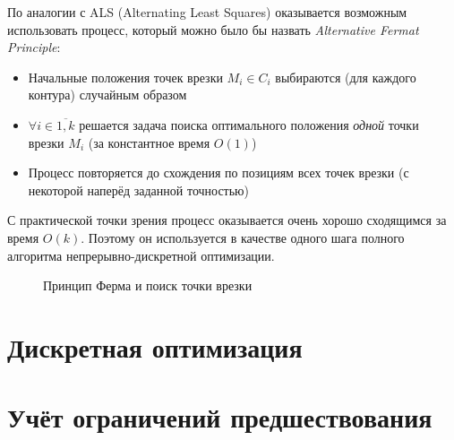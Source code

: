 \documentclass{article}
\begin{document}
По аналогии с ALS
(Alternating Least Squares)
оказывается возможным использовать
процесс,
который можно было бы назвать
\textit{Alternative Fermat Principle}:
\begin{itemize}
    \item{}
    Начальные положения точек врезки 
    $M_i \in C_i$
    выбираются
    (для каждого контура)
    случайным образом
    \item{}
    $\forall i \in \overline{1,k}$
    решается задача поиска оптимального положения
    \textit{одной} точки врезки $M_i$
    (за константное время $O(1)$)
    \item{}
    Процесс повторяется до схождения
    по позициям всех точек врезки
    (с некоторой наперёд заданной точностью)
\end{itemize}
С практической точки зрения процесс оказывается
очень хорошо сходящимся за время $O(k)$.
Поэтому он используется в качестве одного шага
полного алгоритма непрерывно-дискретной оптимизации.

\begin{figure}
    \begin{center}
    \caption{Принцип Ферма и поиск точки врезки} \label{fermat}
    \end{center}    
\end{figure}

\section{Дискретная оптимизация}

\section{Учёт ограничений предшествования}
\end{document}
